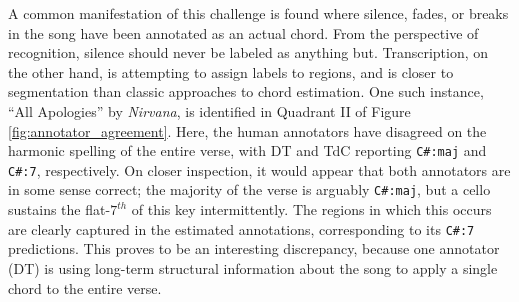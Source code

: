 \documentclass{article}
\begin{document}
A common manifestation of this challenge is found where silence, fades, or breaks in the song have been annotated as an actual chord.
From the perspective of recognition, silence should never be labeled as anything but.
Transcription, on the other hand, is attempting to assign labels to regions, and is closer to segmentation than classic approaches to chord estimation.
One such instance, ``All Apologies'' by \emph{Nirvana}, is identified in Quadrant II of Figure \ref{fig:annotator_agreement}.
Here, the human annotators have disagreed on the harmonic spelling of the entire verse, with DT and TdC reporting \texttt{C\#:maj} and \texttt{C\#:7}, respectively.
On closer inspection, it would appear that both annotators are in some sense correct;
the majority of the verse is arguably \texttt{C\#:maj}, but a cello sustains the flat-$7^{th}$ of this key intermittently.
The regions in which this occurs are clearly captured in the estimated annotations, corresponding to its \texttt{C\#:7} predictions.
This proves to be an interesting discrepancy, because one annotator (DT) is using long-term structural information about the song to apply a single chord to the entire verse.
\end{document}
